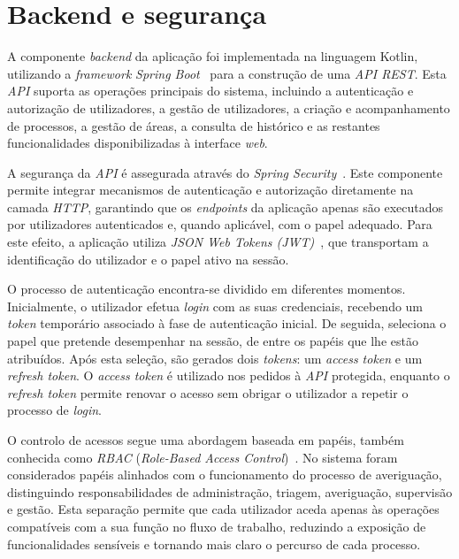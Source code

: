 \section{Backend e seguran\c{c}a} \label{sec:backend-seguranca}

A componente \textit{backend} da aplica\c{c}\~{a}o foi implementada na linguagem Kotlin, utilizando a \textit{framework} \textit{Spring Boot}~\cite{spring-boot} para a constru\c{c}\~{a}o de uma \textit{API REST}. Esta \textit{API} suporta as opera\c{c}\~{o}es principais do sistema, incluindo a autentica\c{c}\~{a}o e autoriza\c{c}\~{a}o de utilizadores, a gest\~{a}o de utilizadores, a cria\c{c}\~{a}o e acompanhamento de processos, a gest\~{a}o de \'{a}reas, a consulta de hist\'{o}rico e as restantes funcionalidades disponibilizadas \`{a} interface \textit{web}.

A seguran\c{c}a da \textit{API} \'{e} assegurada atrav\'{e}s do \textit{Spring Security}~\cite{spring-security}. Este componente permite integrar mecanismos de autentica\c{c}\~{a}o e autoriza\c{c}\~{a}o diretamente na camada \textit{HTTP}, garantindo que os \textit{endpoints} da aplica\c{c}\~{a}o apenas s\~{a}o executados por utilizadores autenticados e, quando aplic\'{a}vel, com o papel adequado. Para este efeito, a aplica\c{c}\~{a}o utiliza \textit{JSON Web Tokens (JWT)}~\cite{rfc-jwt}, que transportam a identifica\c{c}\~{a}o do utilizador e o papel ativo na sess\~{a}o.

O processo de autentica\c{c}\~{a}o encontra-se dividido em diferentes momentos. Inicialmente, o utilizador efetua \textit{login} com as suas credenciais, recebendo um \textit{token} tempor\'{a}rio associado \`{a} fase de autentica\c{c}\~{a}o inicial. De seguida, seleciona o papel que pretende desempenhar na sess\~{a}o, de entre os pap\'{e}is que lhe est\~{a}o atribu\'{i}dos. Ap\'{o}s esta sele\c{c}\~{a}o, s\~{a}o gerados dois \textit{tokens}: um \textit{access token} e um \textit{refresh token}. O \textit{access token} \'{e} utilizado nos pedidos \`{a} \textit{API} protegida, enquanto o \textit{refresh token} permite renovar o acesso sem obrigar o utilizador a repetir o processo de \textit{login}.

O controlo de acessos segue uma abordagem baseada em pap\'{e}is, tamb\'{e}m conhecida como \textit{RBAC} (\textit{Role-Based Access Control})~\cite{nist-rbac}. No sistema foram considerados pap\'{e}is alinhados com o funcionamento do processo de averigua\c{c}\~{a}o, distinguindo responsabilidades de administra\c{c}\~{a}o, triagem, averigua\c{c}\~{a}o, supervis\~{a}o e gest\~{a}o. Esta separa\c{c}\~{a}o permite que cada utilizador aceda apenas \`{a}s opera\c{c}\~{o}es compat\'{i}veis com a sua fun\c{c}\~{a}o no fluxo de trabalho, reduzindo a exposi\c{c}\~{a}o de funcionalidades sens\'{i}veis e tornando mais claro o percurso de cada processo.

